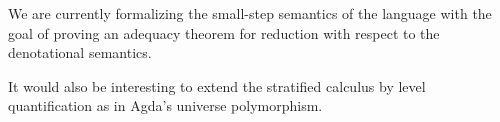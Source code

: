 \documentclass[acmsmall,anonymous,review,screen]{acmart}
\begin{document}
We are currently formalizing the small-step semantics of the language
with the goal of proving an adequacy theorem for reduction with
respect to the denotational semantics.

It would also be interesting to extend the stratified calculus by
level quantification as in Agda's universe polymorphism.







\end{document}
